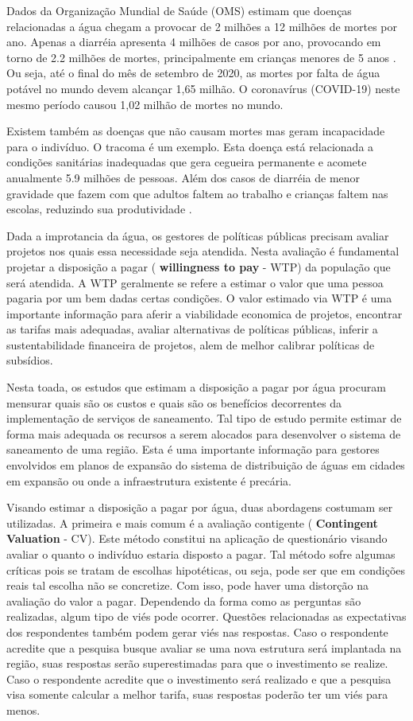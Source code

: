 \documentclass[
  12pt,
]{book}
\begin{document}
Dados da Organização Mundial de Saúde (OMS) estimam que doenças relacionadas a água chegam a provocar de 2 milhões a 12 milhões de mortes por ano. Apenas a diarréia apresenta 4 milhões de casos por ano, provocando em torno de 2.2 milhões de mortes, principalmente em crianças menores de 5 anos \citep{who}. Ou seja, até o final do mês de setembro de 2020, as mortes por falta de água potável no mundo devem alcançar 1,65 milhão. O coronavírus (COVID-19) neste mesmo período causou 1,02 milhão de mortes no mundo.

Existem também as doenças que não causam mortes mas geram incapacidade para o indivíduo. O tracoma é um exemplo. Esta doença está relacionada a condições sanitárias inadequadas que gera cegueira permanente e acomete anualmente 5.9 milhões de pessoas. Além dos casos de diarréia de menor gravidade que fazem com que adultos faltem ao trabalho e crianças faltem nas escolas, reduzindo sua produtividade \citep{PGleick}.

Dada a improtancia da água, os gestores de políticas públicas precisam avaliar projetos nos quais essa necessidade seja atendida. Nesta avaliação é fundamental projetar a disposição a pagar ( \textbf{willingness to pay} - WTP) da população que será atendida. A WTP geralmente se refere a estimar o valor que uma pessoa pagaria por um bem dadas certas condições. O valor estimado via WTP é uma importante informação para aferir a viabilidade economica de projetos, encontrar as tarifas mais adequadas, avaliar alternativas de políticas públicas, inferir a sustentabilidade financeira de projetos, alem de melhor calibrar políticas de subsídios.

Nesta toada, os estudos que estimam a disposição a pagar por água procuram mensurar quais são os custos e quais são os benefícios decorrentes da implementação de serviços de saneamento. Tal tipo de estudo permite estimar de forma mais adequada os recursos a serem alocados para desenvolver o sistema de saneamento de uma região. Esta é uma importante informação para gestores envolvidos em planos de expansão do sistema de distribuição de águas em cidades em expansão ou onde a infraestrutura existente é precária.

Visando estimar a disposição a pagar por água, duas abordagens costumam ser utilizadas. A primeira e mais comum é a avaliação contigente ( \textbf{Contingent Valuation} - CV). Este método constitui na aplicação de questionário visando avaliar o quanto o indivíduo estaria disposto a pagar. Tal método sofre algumas críticas pois se tratam de escolhas hipotéticas, ou seja, pode ser que em condições reais tal escolha não se concretize. Com isso, pode haver uma distorção na avaliação do valor a pagar. Dependendo da forma como as perguntas são realizadas, algum tipo de viés pode ocorrer. Questões relacionadas as expectativas dos respondentes também podem gerar viés nas respostas. Caso o respondente acredite que a pesquisa busque avaliar se uma nova estrutura será implantada na região, suas respostas serão superestimadas para que o investimento se realize. Caso o respondente acredite que o investimento será realizado e que a pesquisa visa somente calcular a melhor tarifa, suas respostas poderão ter um viés para menos.
\end{document}
